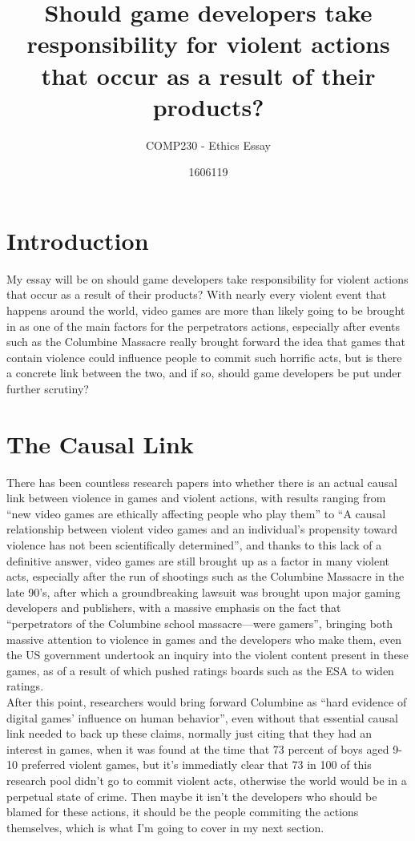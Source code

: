 \documentclass{scrartcl}
\title{Should game developers take responsibility for violent actions that occur as a result of their products?}
\subtitle{COMP230 - Ethics Essay}
\author{1606119}
\begin{document}
\maketitle

\abstract{} 

\section{Introduction}
My essay will be on should game developers take responsibility for violent actions that occur as a result of their products? With nearly every violent event that happens around the world, video games are more than likely going to be brought in as one of the main factors for the perpetrators actions, especially after events such as the Columbine Massacre really brought forward the idea that games that contain violence could influence people to commit such horrific acts, but is there a concrete link between the two, and if so, should game developers be put under further scrutiny?

\section{The Causal Link}
There has been countless research papers into whether there is an actual causal link between violence in games and violent actions, with results ranging from ``new video games are ethically affecting people who play them''\cite{lekka2014computer} to ``A causal relationship between violent video games and an individual’s propensity toward violence has not been scientifically determined''\cite{chakraborty2015public}, and thanks to this lack of a definitive answer, video games are still brought up as a factor in many violent acts, especially after the run of shootings such as the Columbine Massacre in the late 90's, after which a groundbreaking lawsuit was brought upon major gaming developers and publishers\cite{familysue}, with a massive emphasis on the fact that ``perpetrators of the Columbine school massacre—were gamers''\cite{tavinor2007towards}, bringing both massive attention to violence in games and the developers who make them, even the US government undertook an inquiry into the violent content present in these games, as of a result of which pushed ratings boards such as the ESA to widen ratings\cite{thayer2007analyzing}.\\

 After this point, researchers would bring forward Columbine as  ``hard evidence of digital games’ influence on human behavior''\cite{thayer2007analyzing}, even without that essential causal link needed to back up these claims, normally just citing that they had an interest in games, when it was found at the time that 73 percent of boys aged 9-10 preferred violent games\cite{chakraborty2015public}, but it's immediatly clear that 73 in 100 of this research pool didn't go to commit violent acts, otherwise the world would be in a perpetual state of crime. Then maybe it isn't the developers who should be blamed for these actions, it should be the people commiting the actions themselves, which is what I'm going to cover in my next section. 
\end{document}
